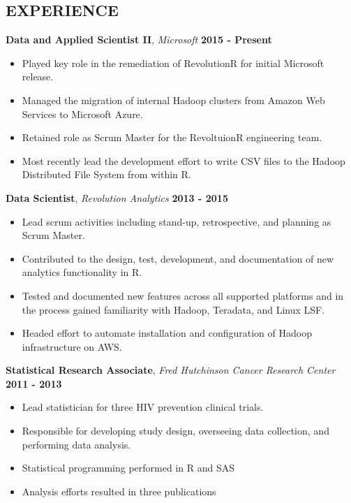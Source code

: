 \documentclass{res}
\begin{document}
\address{801 17th Ave\\Seattle, WA 98122} 
\address{\textit{T:} (734) 754-6020\\\textit{Email:} casey.m.herron@gmail.com}
\begin{resume}

\section{EXPERIENCE}
\vspace*{+0.2cm}
\textbf{Data and Applied Scientist II}, \textit{Microsoft} \hfill \textbf{2015 - Present}
\begin{itemize} \itemsep -2pt
\item Played key role in the remediation of RevolutionR for initial Microsoft release.
\item Managed the migration of internal Hadoop clusters from Amazon Web Services to Microsoft Azure.
\item Retained role as Scrum Master for the RevoltuionR engineering team.
\item Most recently lead the development effort to write CSV files to the Hadoop Distributed File System from within R.
\end{itemize}

\textbf{Data Scientist}, \textit{Revolution Analytics} \hfill \textbf{2013 - 2015}
\begin{itemize} \itemsep -2pt
\item Lead scrum activities including stand-up, retrospective, and planning as Scrum Master.
\item Contributed to the design, test, development, and documentation of new analytics functionality in R.
\item Tested and documented new features across all supported platforms and in the process gained familiarity with Hadoop, Teradata, and Linux LSF.
\item Headed effort to automate installation and configuration of Hadoop infrastructure on AWS.
\end{itemize}

\textbf{Statistical Research Associate}, \textit{Fred Hutchinson Cancer Research Center} \hfill \textbf{2011 - 2013}
\begin{itemize} \itemsep -2pt
\item Lead statistician for three HIV prevention clinical trials.
\item Responsible for developing study design, overseeing data collection, and performing data analysis.
\item Statistical programming performed in R and SAS
\item Analysis efforts resulted in three publications
\end{itemize}


\end{resume}
\end{document}
